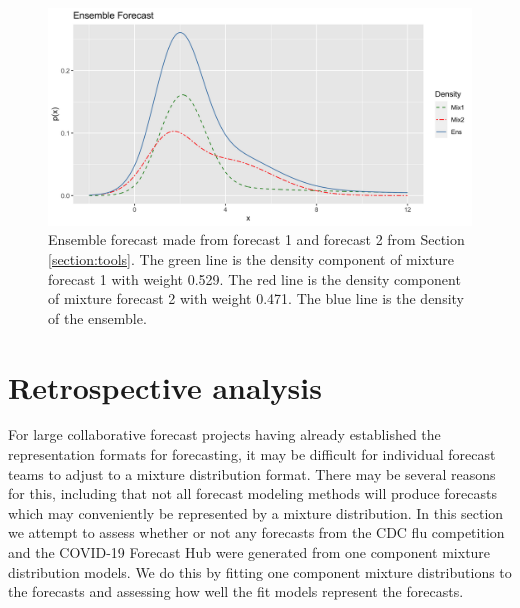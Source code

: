 \documentclass[11pt,notitlepage]{isuthesis}
\begin{document}
\begin{figure}[htbp]
\centerline{\includegraphics[scale=.15]{Images/mix_ense.png}}
\caption[Toy ensemble forecast]{Ensemble forecast made from forecast 1 and 
forecast 2 from Section \ref{section:tools}. The green line is the density 
component of mixture forecast 1 with weight 0.529. The 
red line is the density component of mixture forecast 2 with weight 
0.471. The blue line is the density of the ensemble.}
\label{fig:mixense}
\end{figure}






















\chapter{Retrospective analysis}
\label{section:retrostud}

For large collaborative forecast projects having already established the 
representation formats for forecasting, it may be difficult for individual
forecast teams to adjust to a mixture distribution format. There may be several
reasons for this, including that not all 
forecast modeling methods will produce forecasts which may conveniently be
represented by a mixture distribution.
In this section we attempt to assess whether or not any forecasts from the CDC
flu competition and the COVID-19 Forecast Hub were generated from one component
mixture distribution models. We do this by fitting one component mixture 
distributions to the forecasts and assessing how well the fit models represent
the forecasts.
\end{document}
